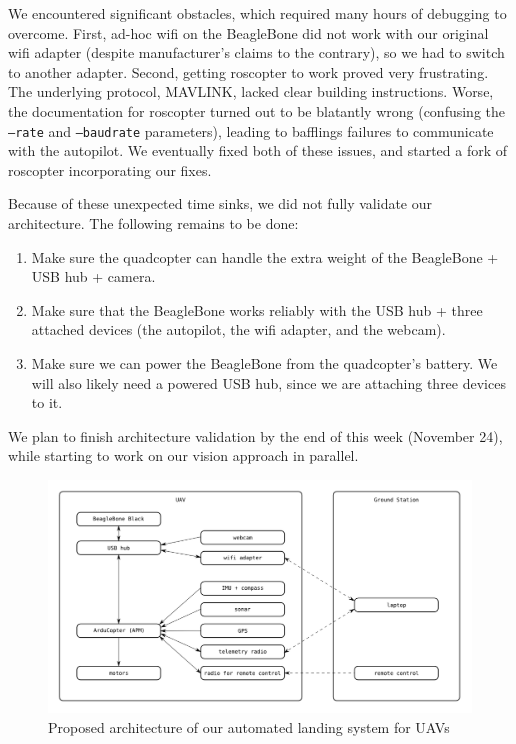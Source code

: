 \documentclass[10pt, twocolumn]{scrartcl} %
\begin{document}
We encountered significant obstacles, which required many hours of debugging to
overcome. First, ad-hoc wifi on the BeagleBone did not work with our original
wifi adapter (despite manufacturer's claims to the contrary), so we had to
switch to another adapter. Second, getting roscopter to work proved very
frustrating. The underlying protocol, MAVLINK, lacked clear building
instructions. Worse, the documentation for roscopter turned out to be blatantly
wrong (confusing the {\tt --rate} and {\tt --baudrate} parameters), leading to
bafflings failures to communicate with the autopilot. We eventually fixed both
of these issues, and started a fork of roscopter incorporating our fixes.

Because of these unexpected time sinks, we did not fully validate our
architecture. The following remains to be done:

\begin{enumerate}
\item Make sure the quadcopter can handle the extra weight of the BeagleBone +
      USB hub + camera.
\item Make sure that the BeagleBone works reliably with the USB hub + three
      attached devices (the autopilot, the wifi adapter, and the webcam).
\item Make sure we can power the BeagleBone from the quadcopter's battery.
      We will also likely need a powered USB hub, since we are attaching three
      devices to it.
\end{enumerate}

We plan to finish architecture validation by the end of this week (November
24), while starting to work on our vision approach in parallel.

\begin{figure}[h]
    \centering
    \includegraphics[width=\textwidth]{images/architecture.png}
    \caption{Proposed architecture of our automated landing system for UAVs}
    \label{fig:architecture}
\end{figure}
\end{document}
